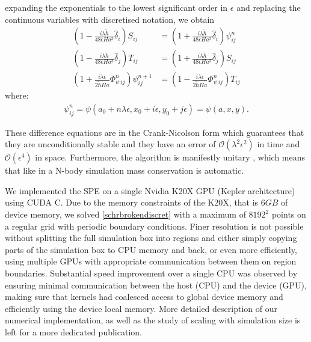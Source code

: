\documentclass[twocolumn, nofootinbib, showpacs, superscriptaddress]{revtex4-1}
\newcommand{\thbar}{\tilde\hbar}
\begin{document}
expanding the exponentials to the lowest significant order in $\epsilon$ and replacing the continuous variables with discretised  notation, we obtain
\begin{subequations}\label{schrbrokendiscret}
\begin{align} 
\left(1-\frac{i\lambda\thbar}{48\epsilon Ha^{3}}\hat{\delta}_{i}\right)S_{ij} &=\left(1+\frac{i\lambda\thbar}{48\epsilon Ha^{3}}\hat{\delta}_{i}\right)\psi_{ij}^{n} \\
\left(1-\frac{i\lambda\thbar}{48 \epsilon Ha^{3}}\hat{\delta}_{j}\right)T_{ij} &= \left(1+\frac{i\lambda\thbar}{48\epsilon Ha^{3}}\hat{\delta}_{j}\right)S_{ij} \\
\left(1+\frac{i\lambda \epsilon}{2\thbar Ha}\varPhi_{\psi\, ij}^{n}\right)\psi_{ij}^{n+1} &= \left(1-\frac{i\lambda \epsilon}{2\thbar Ha}\varPhi_{\psi\, ij}^{n}\right) T_{ij}
\end{align}
\end{subequations}
where: 
\begin{align} 
\psi_{ij}^{n}=\psi(a_{0}+n\lambda \epsilon,x_{0}+i\epsilon,y_{0}+j\epsilon)=\psi(a,x,y).
\end{align}

These difference equations are in the Crank-Nicolson form which guarantees that they are unconditionally stable and they have an error of $\mathcal{O}(\lambda^{2} \epsilon^{2})$ in time and $\mathcal{O}(\epsilon^{4})$ in space. Furthermore, the algorithm is manifestly unitary \cite{GoldbergScheySchwartz1967}, which means that like in a N-body simulation mass conservation is automatic.

We implemented the SPE on a single Nvidia K20X GPU (Kepler architecture) using CUDA C.
Due to the memory constraints of the K20X, that is $6GB$ of device memory,
we solved \eqref{schrbrokendiscret} with a maximum of $8192^2$ points on a regular grid with periodic boundary conditions. 
Finer resolution  is not possible without splitting the full simulation box into regions and 
either simply copying parts of the simulation box to CPU memory and back,
or even more efficiently, using multiple GPUs with appropriate communication between them on region boundaries.
 Substantial speed improvement over a single CPU was observed by ensuring minimal communication between the host (CPU) and the device (GPU),
 making sure that kernels had coalesced access to global device memory and
efficiently using the device local memory. More detailed description of our numerical implementation, as well as the study of 
 scaling with simulation size is left for a more dedicated publication.
\end{document}
